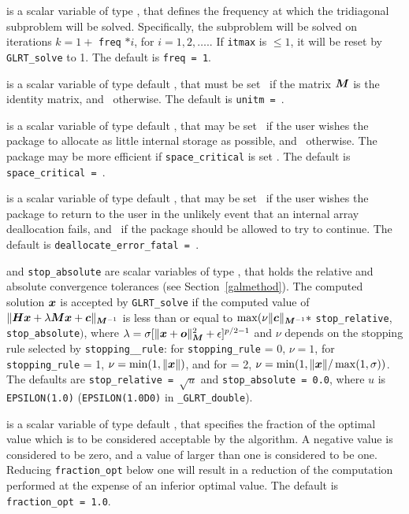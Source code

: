 \documentclass{galahad}
\newcommand{\packagename}{GL\-RT}
\newcommand{\fullpackagename}{\libraryname\_\packagename}
\begin{document}
\begin{description}
 is a scalar variable of type \integer, that
defines the frequency at which the tridiagonal subproblem will
be solved. Specifically, the subproblem will be solved on iterations
$k=1+$ {\tt freq} $\ast i$, for $i = 1, 2, \ldots.$.
If {\tt itmax} is $\leq 1$, it will be reset by
{\tt \packagename\_solve} to 1.
The default is {\tt freq = 1}.

 is a scalar variable of type default \logical, that
must be set \true\ if the matrix ${\bm{M}}$ is the identity matrix, and
\false\ otherwise.
The default is {\tt unitm = \true}.

 is a scalar variable of type default \logical, that
may be set \true\ if the user wishes the package to allocate as little
internal storage as possible, and \false\ otherwise. The package may
be more efficient if {\tt space\_critical} is set \false.
The default is {\tt space\_critical = \false}.

 is a scalar variable of type default \logical,
that may be set \true\ if the user wishes the package to return to the user
in the unlikely event that an internal array deallocation fails,
and \false\ if the package should be allowed to try to continue.
The default is {\tt deallocate\_error\_fatal = \false}.

 and {\tt stop\_absolute} are scalar variables of type
\realdp, that holds the
relative and absolute convergence tolerances (see Section~\ref{galmethod}).
The computed solution ${\bm{x}}$ is accepted by {\tt \packagename\_solve}
if the computed value of
$\|{\bm{H}} {\bm{x}} + \lambda {\bm{M}} {\bm{x}} + {\bm{c}}\|_{{{\bm{M}}^{-1}}} $ is less than or equal
to $\max (\nu \| {\bm{c}}\|_{{\bm{M}}^{-1}} \ast$ {\tt stop\_relative},
{\tt stop\_absolute}$)$, where $\lambda =
\sigma [ \|{\bm{x}}+{\bm{o}}\|_{{\bm{M}}}^2 + \epsilon]^{p/2-1}$ and $\nu$
depends on the stopping rule selected by %
{\tt stopping\_\_rule}:
for  {\tt stopping\_rule} = 0, $\nu = 1$,
for  {\tt stopping\_rule} = 1, $\nu = \min( 1, \|{\bm{x}}\|)$, and
for   = 2,
$\nu = \min( 1, \|{\bm{x}}\|/ \max(1,\sigma))$.
The defaults are {\tt stop\_relative = $\sqrt{u}$} and
{\tt stop\_absolute = 0.0},
where $u$ is {\tt EPSILON(1.0)} ({\tt EPSILON(1.0D0)} in
{\tt \fullpackagename\_double}).

 is a scalar variable of type default
\realdp, that specifies the fraction
of the optimal value which is to be considered acceptable by the algorithm.
A negative value is considered to be zero, and a value of larger than one
is considered to be one. Reducing {\tt fraction\_opt} below one will result
in a reduction of the computation performed at the expense of an inferior
optimal value.
The default is {\tt fraction\_opt = 1.0}.


\end{description}
\end{document}
